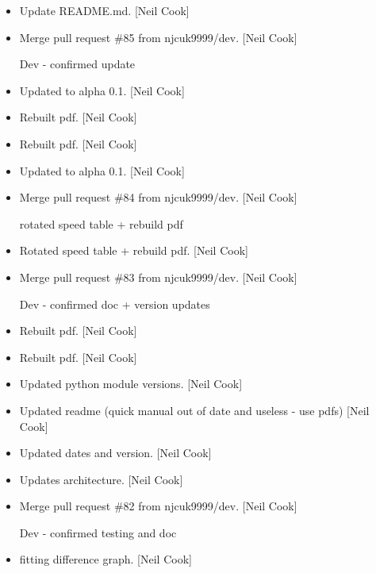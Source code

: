 \documentclass[a4paper,10pt,english]{report}
\begin{document}
\label{\detokenize{misc/changelog:id500}}\begin{itemize}
\item {} 
Update README.md. {[}Neil Cook{]}

\item {} 
Merge pull request \#85 from njcuk9999/dev. {[}Neil Cook{]}

Dev - confirmed update

\item {} 
Updated to alpha 0.1. {[}Neil Cook{]}

\item {} 
Rebuilt pdf. {[}Neil Cook{]}

\item {} 
Rebuilt pdf. {[}Neil Cook{]}

\item {} 
Updated to alpha 0.1. {[}Neil Cook{]}

\item {} 
Merge pull request \#84 from njcuk9999/dev. {[}Neil Cook{]}

rotated speed table + rebuild pdf

\item {} 
Rotated speed table + rebuild pdf. {[}Neil Cook{]}

\item {} 
Merge pull request \#83 from njcuk9999/dev. {[}Neil Cook{]}

Dev - confirmed doc + version updates

\item {} 
Rebuilt pdf. {[}Neil Cook{]}

\item {} 
Rebuilt pdf. {[}Neil Cook{]}

\item {} 
Updated python module versions. {[}Neil Cook{]}

\item {} 
Updated readme (quick manual out of date and useless - use pdfs) {[}Neil
Cook{]}

\item {} 
Updated dates and version. {[}Neil Cook{]}

\item {} 
Updates architecture. {[}Neil Cook{]}

\item {} 
Merge pull request \#82 from njcuk9999/dev. {[}Neil Cook{]}

Dev - confirmed testing and doc

\item {} 
 fitting difference graph. {[}Neil Cook{]}


\end{itemize}
\end{document}
